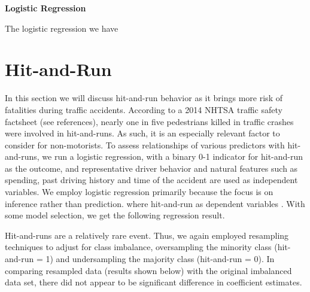 \documentclass[11pt, oneside,titlepage]{article}   	%
\begin{document}
\textbf{Logistic Regression}

The logistic regression we have 

\section*{Hit-and-Run}
In this section we will discuss hit-and-run behavior as it brings more risk of fatalities during traffic accidents. According to a 2014 NHTSA traffic safety factsheet (see references), nearly one in five pedestrians killed in traffic crashes were involved in hit-and-runs. As such, it is an especially relevant factor to consider for non-motorists. To assess relationships of various predictors with hit-and-runs, we run a logistic regression, with a binary 0-1 indicator for hit-and-run as the outcome, and representative driver behavior and natural features such as spending, past driving history and time of the accident are used as independent variables. We employ logistic regression primarily because the focus is on inference rather than prediction. where hit-and-run as dependent variables . With some model selection, we get the following regression result.

Hit-and-runs are a relatively rare event. Thus, we again employed resampling techniques to adjust for class imbalance, oversampling the minority class (hit-and-run = 1) and undersampling the majority class (hit-and-run = 0). In comparing resampled data (results shown below) with the original imbalanced data set, there did not appear to be significant difference in coefficient estimates.
\end{document}
